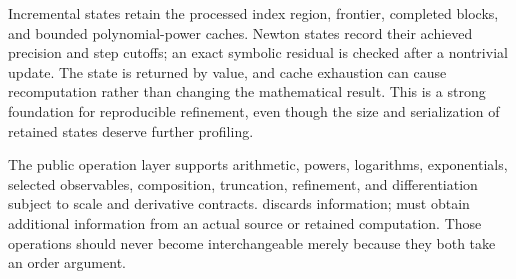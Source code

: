 Incremental states retain the processed index region, frontier, completed blocks, and bounded polynomial-power caches. Newton states record their achieved precision and step cutoffs; an exact symbolic residual is checked after a nontrivial update. The state is returned by value, and cache exhaustion can cause recomputation rather than changing the mathematical result. This is a strong foundation for reproducible refinement, even though the size and serialization of retained states deserve further profiling.\cite{incremental}

The public operation layer supports arithmetic, powers, logarithms, exponentials, selected observables, composition, truncation, refinement, and differentiation subject to scale and derivative contracts.  discards information;  must obtain additional information from an actual source or retained computation. Those operations should never become interchangeable merely because they both take an order argument.\cite{operations,arithmetic,guide}

